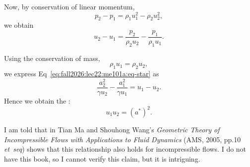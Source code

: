 \begin{node}
Now, by conservation of linear momentum,
\begin{equation*}
p_{2}-p_{1}=\rho_{1}u_{1}^{2}-\rho_{2}u_{2}^{2},
\end{equation*}
we obtain
\begin{equation}
u_{2}-u_{1}=\frac{p_{2}}{\rho_{2}u_{2}}-\frac{p_{1}}{\rho_{1}u_{1}}.
\end{equation}
\end{node}

\begin{node}
Using the conservation of mass,
\begin{equation*}
\rho_{1}u_{1}=\rho_{2}u_{2},
\end{equation*}
we express Eq~\eqref{eq:fall2026:lec22:me101a:eq-star} as
\begin{equation}
\frac{a_{2}^{2}}{\gamma u_{2}}-\frac{a_{1}^{2}}{\gamma u_{1}}=u_{1}-u_{2}.
\end{equation}
Hence we obtain the :
\begin{equation}
\boxed{u_{1}u_{2}=(a^{*})^{2}.}
\end{equation}
\end{node}

\begin{aside}
I am told that in Tian Ma and Shouhong Wang's \textit{Geometric Theory of Incompressible Flows with Applications to Fluid Dynamics}
(AMS, 2005, pp.10 \textit{et~seq}) shows that this relationship also
holds for incompressible flows. I do not have this book, so I cannot
verify this claim, but it is intriguing.
\end{aside}
